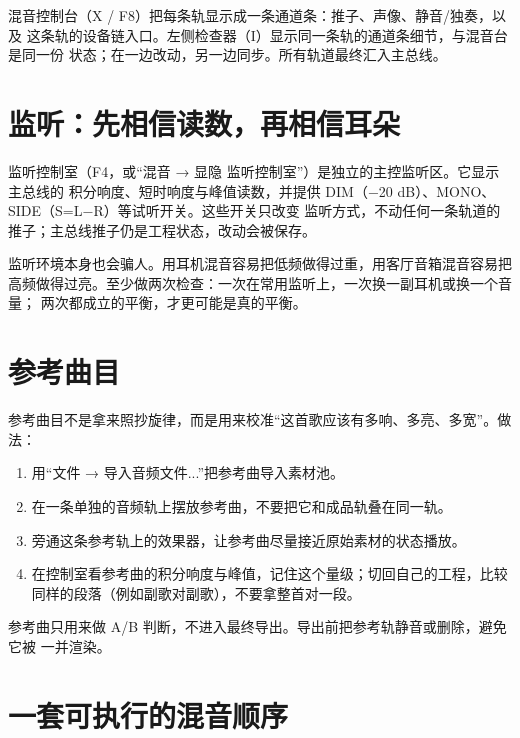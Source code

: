 混音控制台（X / F8）把每条轨显示成一条通道条：推子、声像、静音/独奏，以及
这条轨的设备链入口。左侧检查器（I）显示同一条轨的通道条细节，与混音台是同一份
状态；在一边改动，另一边同步。所有轨道最终汇入主总线。

\section{监听：先相信读数，再相信耳朵}

监听控制室（F4，或“混音 → 显隐 监听控制室”）是独立的主控监听区。它显示主总线的
积分响度、短时响度与峰值读数，并提供 DIM（−20 dB）、MONO、SIDE（S=L−R）等试听开关。这些开关只改变
监听方式，不动任何一条轨道的推子；主总线推子仍是工程状态，改动会被保存。



监听环境本身也会骗人。用耳机混音容易把低频做得过重，用客厅音箱混音容易把
高频做得过亮。至少做两次检查：一次在常用监听上，一次换一副耳机或换一个音量；
两次都成立的平衡，才更可能是真的平衡。

\section{参考曲目}

参考曲目不是拿来照抄旋律，而是用来校准“这首歌应该有多响、多亮、多宽”。做法：

\begin{enumerate}
  \item 用“文件 → 导入音频文件...”把参考曲导入素材池。
  \item 在一条单独的音频轨上摆放参考曲，不要把它和成品轨叠在同一轨。
  \item 旁通这条参考轨上的效果器，让参考曲尽量接近原始素材的状态播放。
  \item 在控制室看参考曲的积分响度与峰值，记住这个量级；切回自己的工程，比较
        同样的段落（例如副歌对副歌），不要拿整首对一段。
\end{enumerate}

参考曲只用来做 A/B 判断，不进入最终导出。导出前把参考轨静音或删除，避免它被
一并渲染。

\section{一套可执行的混音顺序}

